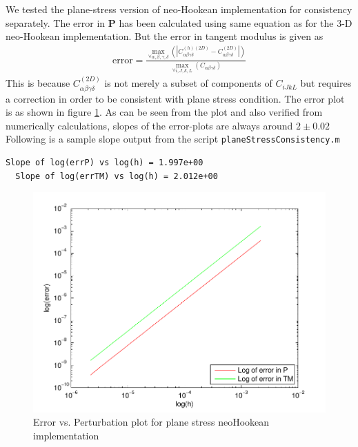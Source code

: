 \documentclass[../main.tex]{subfiles}
\begin{document}
We tested the plane-stress version of neo-Hookean implementation for consistency separately. The error in $\mathbf{P}$ has been calculated using same equation as for the 3-D neo-Hookean implementation. But the error in tangent modulus is given as
\begin{align*}
  \text{error} =\frac{\underset{\forall \alpha,\beta,\gamma,\delta}{\max}\left(|C^{(h)(2D)}_{\alpha\beta\gamma\delta}-C^{(2D)}_{\alpha\beta\gamma\delta}|\right)}{\underset{\forall i,J,k,L}{\max}\left(C_{\alpha\beta\gamma\delta}\right)}
\end{align*}
This is because $C^{(2D)}_{\alpha\beta\gamma\delta}$ is not merely a subset of components of $C_{iJkL}$ but requires a correction in order to be consistent with plane stress condition. The error plot is as shown in figure \ref{fig:psneoHcon}. As can be seen from the plot and also verified from numerically calculations, slopes of the error-plots are always around $2\pm0.02$ Following is a sample slope output from the script \texttt{planeStressConsistency.m}
\begin{lstlisting}[frame=single]
  Slope of log(errP) vs log(h) = 1.997e+00
  Slope of log(errTM) vs log(h) = 2.012e+00
\end{lstlisting}
\begin{figure}[h]
  \centering
  \includegraphics{./img/planeStressConsistency.pdf}  
  \caption{Error vs. Perturbation plot for plane stress neoHookean implementation}
  \label{fig:psneoHcon}
\end{figure}
\end{document}
